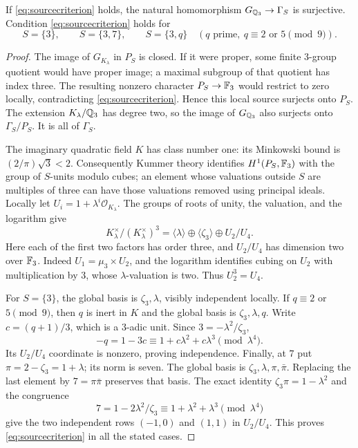 \begin{lemma}\label{lem:source}
If \eqref{eq:sourcecriterion} holds, the natural homomorphism
$G_{\mathbb Q_3}\to\Gamma_S$ is surjective. Condition
\eqref{eq:sourcecriterion} holds for
\[
 S=\{3\},\qquad S=\{3,7\},\qquad
 S=\{3,q\}\quad(q\text{ prime},\ q\equiv2\text{ or }5\pmod9).
\]
\end{lemma}
\begin{proof}
The image of $G_{K_\lambda}$ in $P_S$ is closed. If it were proper,
some finite $3$-group quotient would have proper image; a maximal
subgroup of that quotient has index three. The resulting nonzero
character $P_S\to\mathbb F_3$ would restrict to zero locally, contradicting
\eqref{eq:sourcecriterion}. Hence this local source surjects onto
$P_S$. The extension $K_\lambda/\mathbb Q_3$ has degree two, so the image of
$G_{\mathbb Q_3}$ also surjects onto $\Gamma_S/P_S$. It is all of $\Gamma_S$.

The imaginary quadratic field $K$ has class number one: its
Minkowski bound is $(2/\pi)\sqrt3<2$. Consequently Kummer theory
identifies $H^1(P_S,\mathbb F_3)$ with the group of $S$-units modulo cubes;
an element whose valuations outside $S$ are multiples of three can
have those valuations removed using principal ideals. Locally let
$U_i=1+\lambda^i\mathcal O_{K_\lambda}$. The groups of roots of unity,
the valuation, and the logarithm give
\[
 K_\lambda^\times/(K_\lambda^\times)^3
 =\langle\lambda\rangle\oplus\langle\zeta_3\rangle
   \oplus U_2/U_4.
\]
Here each of the first two factors has order three, and $U_2/U_4$
has dimension two over $\mathbb F_3$. Indeed $U_1=\mu_3\times U_2$, and
the logarithm identifies cubing on $U_2$ with multiplication by $3$,
whose $\lambda$-valuation is two. Thus $U_2^3=U_4$.

For $S=\{3\}$, the global basis is $\zeta_3,\lambda$, visibly
independent locally. If $q\equiv2$ or $5\pmod9$, then $q$ is inert
in $K$ and the global basis is $\zeta_3,\lambda,q$. Write
$c=(q+1)/3$, which is a $3$-adic unit. Since
$3=-\lambda^2/\zeta_3$,
\[
 -q=1-3c\equiv1+c\lambda^2+c\lambda^3\pmod{\lambda^4}.
\]
Its $U_2/U_4$ coordinate is nonzero, proving independence.
Finally, at $7$ put $\pi=2-\zeta_3=1+\lambda$; its norm is seven.
The global basis is $\zeta_3,\lambda,\pi,\bar\pi$.
Replacing the last element by $7=\pi\bar\pi$ preserves that basis.
The exact identity $\zeta_3\pi=1-\lambda^2$ and the congruence
\[
7=1-2\lambda^2/\zeta_3
 \equiv1+\lambda^2+\lambda^3\pmod{\lambda^4}
\]
give the two independent rows $(-1,0)$ and $(1,1)$ in $U_2/U_4$.
This proves \eqref{eq:sourcecriterion} in all the stated cases.
\end{proof}

